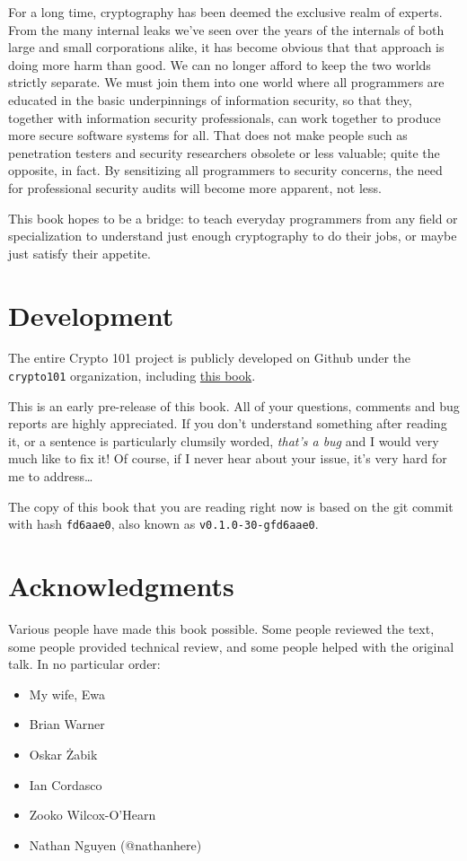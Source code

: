 \documentclass[11pt,ebook,table,dvipsnames]{memoir}
\begin{document}
For a long time, cryptography has been deemed the exclusive realm of
experts. From the many internal leaks we've seen over the years of the
internals of both large and small corporations alike, it has become
obvious that that approach is doing more harm than good. We can no
longer afford to keep the two worlds strictly separate. We must join
them into one world where all programmers are educated in the basic
underpinnings of information security, so that they, together with
information security professionals, can work together to produce more
secure software systems for all. That does not make people such as
penetration testers and security researchers obsolete or less
valuable; quite the opposite, in fact. By sensitizing all programmers
to security concerns, the need for professional security audits will
become more apparent, not less.

This book hopes to be a bridge: to teach everyday programmers from any
field or specialization to understand just enough cryptography to do
their jobs, or maybe just satisfy their appetite.
\chapter{Development}
\label{sec-1-2}

The entire Crypto 101 project is publicly developed on Github under the
\verb~crypto101~ organization, including \href{https://www.github.com/crypto101/book}{this book}.

This is an early pre-release of this book. All of your questions,
comments and bug reports are highly appreciated. If you don't
understand something after reading it, or a sentence is particularly
clumsily worded, \emph{that's a bug} and I would very much like to fix it!
Of course, if I never hear about your issue, it's very hard for me to
address\ldots{}

The copy of this book that you are reading right now is based on the
git commit with hash \texttt{fd6aae0}, also known as \texttt{v0.1.0-30-gfd6aae0}.
\chapter{Acknowledgments}
\label{sec-1-3}

Various people have made this book possible. Some people reviewed the
text, some people provided technical review, and some people helped
with the original talk. In no particular order:

\begin{itemize}
\item My wife, Ewa
\item Brian Warner
\item Oskar Żabik
\item Ian Cordasco
\item Zooko Wilcox-O'Hearn
\item Nathan Nguyen (@nathanhere)
\end{itemize}
\end{document}
